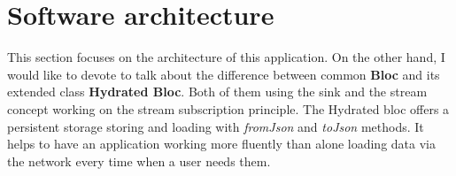 \section{Software architecture}\label{sec:software-architecture}
This section focuses on the architecture of this application.
On the other hand, I would like to devote to talk about the difference between common \textbf{Bloc} and its extended class \textbf{Hydrated Bloc}.
Both of them using the sink and the stream concept working on the stream subscription principle.
The Hydrated bloc offers a persistent storage storing and loading with \textit{fromJson} and \textit{toJson} methods.
It helps to have an application working more fluently than alone loading data via the network every time when a user needs them.









